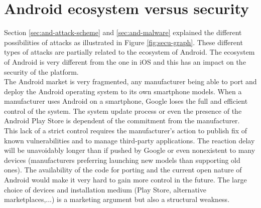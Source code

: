 \section{Android ecosystem versus security}
\label{sec:and-echosystem}

Section \ref{sec:and-attack-scheme} and \ref{sec:and-malware} explained the different possibilities of attacks as illustrated in Figure \ref{fig:secu-graph}.
These different types of attacks are partially related to the ecosystem of Android.
The ecosystem of Android is very different from the one in iOS and this has an impact on the security of the platform.\\

The Android market is very fragmented, any manufacturer being able to port and deploy the Android operating system to its own smartphone models.
When a manufacturer uses Android on a smartphone, Google loses the full and efficient control of the system.
The system update process or even the presence of the Android Play Store is dependent of the commitment from the manufacturer.\\

This lack of a strict control requires  the manufacturer's action to publish fix of known vulnerabilities and to manage third-party applications.
The reaction delay will be unavoidably longer than if pushed by Google or even nonexistent to many devices (manufacturers preferring launching new models than supporting old ones).
The availability of the code for porting and the current open nature of Android would make it very hard to gain more control in the future.
The large choice of devices and installation medium (Play Store, alternative marketplaces,...) is a marketing argument but also a structural weakness.

